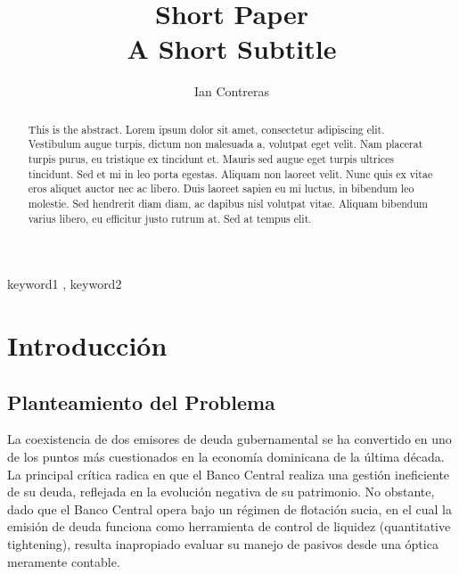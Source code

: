 \documentclass[
  authoryear,
  review]{elsarticle}
\renewcommand*\contentsname{Tabla de contenidos}
\newcommand\contentsname{Tabla de contenidos}
\begin{document}
\begin{frontmatter}
\title{Short Paper \\\large{A Short Subtitle} }
\author[1]{Ian Contreras%
%
}



        
\begin{abstract}
This is the abstract. Lorem ipsum dolor sit amet, consectetur adipiscing
elit. Vestibulum augue turpis, dictum non malesuada a, volutpat eget
velit. Nam placerat turpis purus, eu tristique ex tincidunt et. Mauris
sed augue eget turpis ultrices tincidunt. Sed et mi in leo porta
egestas. Aliquam non laoreet velit. Nunc quis ex vitae eros aliquet
auctor nec ac libero. Duis laoreet sapien eu mi luctus, in bibendum leo
molestie. Sed hendrerit diam diam, ac dapibus nisl volutpat vitae.
Aliquam bibendum varius libero, eu efficitur justo rutrum at. Sed at
tempus elit.
\end{abstract}





\begin{keyword}
    keyword1 \sep 
    keyword2
\end{keyword}
\end{frontmatter}
    
\renewcommand*\contentsname{Tabla de contenidos}
{
\hypersetup{linkcolor=}
\setcounter{tocdepth}{3}
\tableofcontents
}

\section{Introducción}\label{introducciuxf3n}

\subsection{Planteamiento del
Problema}\label{planteamiento-del-problema}

La coexistencia de dos emisores de deuda gubernamental se ha convertido
en uno de los puntos más cuestionados en la economía dominicana de la
última década. La principal crítica radica en que el Banco Central
realiza una gestión ineficiente de su deuda, reflejada en la evolución
negativa de su patrimonio. No obstante, dado que el Banco Central opera
bajo un régimen de flotación sucia, en el cual la emisión de deuda
funciona como herramienta de control de liquidez (quantitative
tightening), resulta inapropiado evaluar su manejo de pasivos desde una
óptica meramente contable.
\end{document}
